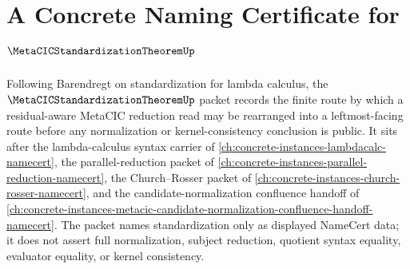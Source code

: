 \chapter{A Concrete Naming Certificate for $\MetaCICStandardizationTheoremUp$}
\label{ch:concrete-instances-metacic-standardization-theorem-namecert}

Following Barendregt on standardization for lambda calculus, the $\MetaCICStandardizationTheoremUp$ packet records the finite route by which a residual-aware MetaCIC reduction read may be rearranged into a leftmost-facing route before any normalization or kernel-consistency conclusion is public. It sits after the lambda-calculus syntax carrier of \autoref{ch:concrete-instances-lambdacalc-namecert}, the parallel-reduction packet of \autoref{ch:concrete-instances-parallel-reduction-namecert}, the Church--Rosser packet of \autoref{ch:concrete-instances-church-rosser-namecert}, and the candidate-normalization confluence handoff of \autoref{ch:concrete-instances-metacic-candidate-normalization-confluence-handoff-namecert}. The packet names standardization only as displayed NameCert data; it does not assert full normalization, subject reduction, quotient syntax equality, evaluator equality, or kernel consistency.


